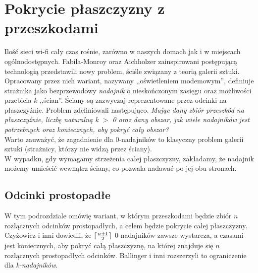 \documentclass[brudnopis]{xmgr}
\DeclarePairedDelimiter\ceil{\lceil}{\rceil}
\theoremstyle{definition}
\begin{document}
\section{Pokrycie płaszczyzny z przeszkodami}
	Ilość sieci wi-fi cały czas rośnie, zarówno w naszych domach jak i w miejscach ogólnodostępnych. Fabila-Monroy oraz Aichholzer zainspirowani postępującą technologią przedstawili nowy problem, ściśle związany z teorią galerii sztuki. Opracowany przez nich wariant, nazywany ,,oświetleniem modemowym'', definiuje strażnika jako bezprzewodowy \emph{nadajnik} o nieskończonym zasięgu oraz możliwości przebicia $k$ ,,ścian''. Ściany są zazwyczaj reprezentowane przez odcinki na płaszczyźnie. Problem zdefiniowali następująco.
\emph{Mając dany zbiór przeszkód na płaszczyźnie, liczbę naturalną k $>$ 0 oraz dany obszar, jak wiele  nadajników jest potrzebnych oraz koniecznych, aby pokryć cały obszar?}  
\\\indent Warto zauważyć, że zagadnienie dla 0-nadajników to klasyczny problem galerii sztuki (strażnicy, którzy nie widzą przez ściany).
\\W wypadku, gdy wymagamy strzeżenia całej płaszczyzny, zakładamy, że nadajnik możemy umieścić wewnątrz ściany, co pozwala nadawać po jej obu stronach.
\subsection{Odcinki prostopadłe}
W tym podrozdziale omówię wariant, w którym przeszkodami będzie zbiór $n$ rozłącznych odcinków prostopadłych, a celem będzie pokrycie całej płaszczyzny. Czyżowicz i inni \cite{czyzowicz} dowiedli, że $\ceil{\frac{n+1}{2}}$ 0-nadajników zawsze wystarcza, a czasami jest koniecznych, aby pokryć całą płaszczyznę, na której znajduje się $n$ rozłącznych prostopadłych odcinków. Ballinger i inni \cite{knadajniki} rozszerzyli to ograniczenie dla \emph{k-nadajników}.
\end{document}
